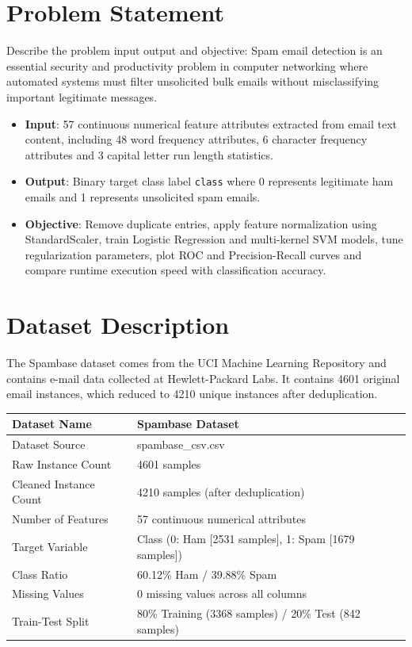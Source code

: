 \documentclass[12pt,a4paper]{article}
\begin{document}
\section{Problem Statement}
Describe the problem input output and objective:
Spam email detection is an essential security and productivity problem in computer networking where automated systems must filter unsolicited bulk emails without misclassifying important legitimate messages.
\begin{itemize}
\item \textbf{Input}: 57 continuous numerical feature attributes extracted from email text content, including 48 word frequency attributes, 6 character frequency attributes and 3 capital letter run length statistics.
\item \textbf{Output}: Binary target class label \texttt{class} where 0 represents legitimate ham emails and 1 represents unsolicited spam emails.
\item \textbf{Objective}: Remove duplicate entries, apply feature normalization using StandardScaler, train Logistic Regression and multi-kernel SVM models, tune regularization parameters, plot ROC and Precision-Recall curves and compare runtime execution speed with classification accuracy.
\end{itemize}

\section{Dataset Description}
The Spambase dataset comes from the UCI Machine Learning Repository and contains e-mail data collected at Hewlett-Packard Labs. It contains 4601 original email instances, which reduced to 4210 unique instances after deduplication.

\begin{longtable}{|p{6cm}|p{8cm}|}
\hline
Dataset Name & Spambase Dataset \\ \hline
Dataset Source & spambase\_csv.csv \\ \hline
Raw Instance Count & 4601 samples \\ \hline
Cleaned Instance Count & 4210 samples (after deduplication) \\ \hline
Number of Features & 57 continuous numerical attributes \\ \hline
Target Variable & Class (0: Ham [2531 samples], 1: Spam [1679 samples]) \\ \hline
Class Ratio & 60.12\% Ham / 39.88\% Spam \\ \hline
Missing Values & 0 missing values across all columns \\ \hline
Train-Test Split & 80\% Training (3368 samples) / 20\% Test (842 samples) \\ \hline
\end{longtable}
\end{document}
